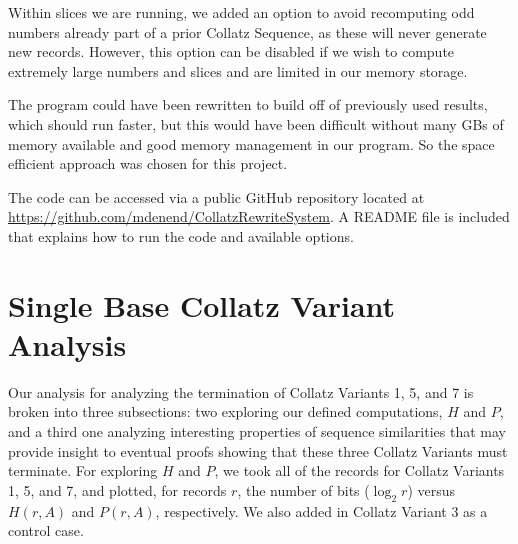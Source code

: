Within slices we are running, we added an option to avoid recomputing odd numbers already part of a prior Collatz Sequence, as these will never generate new records. However, this option can be disabled if we wish to compute extremely large numbers and slices and are limited in our memory storage. \par
The program could have been rewritten to build off of previously used results, which should run faster, but this would have been difficult without many GBs of memory available and good memory management in our program. So the space efficient approach was chosen for this project.\par
The code can be accessed via a public GitHub repository located at \url{https://github.com/mdenend/CollatzRewriteSystem}. A README file is included that explains how to run the code and available options.
\section{Single Base Collatz Variant Analysis} \label{subsec:algsinglebase}
Our analysis for analyzing the termination of Collatz Variants 1, 5, and 7 is broken into three subsections: two exploring our defined computations, $H$ and $P$, and a third one analyzing interesting properties of sequence similarities that may provide insight to eventual proofs showing that these three Collatz Variants must terminate.
For exploring $H$ and $P$, we took all of the records for Collatz Variants 1, 5, and 7, and plotted, for records $r$, the number of bits ($\log_2{r}$) versus $H(r,A)$ and $P(r,A)$, respectively. We also added in Collatz Variant 3 as a control case.
